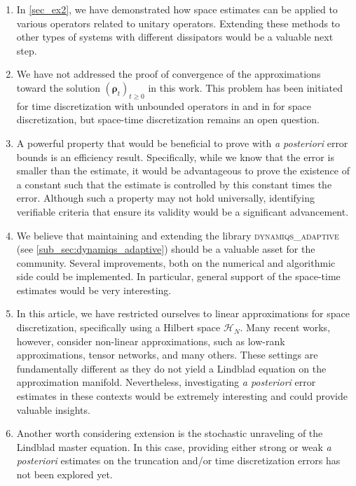 \documentclass[a4paper,onecolumn,amsmath,amssymb,amsfonts,accepted=2026-03-06]{quantumarticle}
\newcommand{\xH}{\mathcal{H}}
\begin{document}
\begin{enumerate}
\item In \cref{sec_ex2}, we have demonstrated how space estimates can be applied to various operators related to unitary operators. Extending these methods to other types of systems with different dissipators would be a valuable next step.
\item We have not addressed the proof of convergence of the approximations toward the solution $(\boldsymbol{\rho}_t)_{t\geq 0}$ in this work. This problem has been initiated for time discretization with unbounded operators in \cite{robin2025unconditionallystabletimediscretization} and in \cite{robin2025convergenceanalysisgalerkinapproximations} for space discretization, but space-time discretization remains an open question.
\item A powerful property that would be beneficial to prove with \textit{a posteriori} error bounds is an efficiency result. Specifically, while we know that the error is smaller than the estimate, it would be advantageous to prove the existence of a constant such that the estimate is controlled by this constant times the error. Although such a property may not hold universally, identifying verifiable criteria that ensure its validity would be a significant advancement.
\item We believe that maintaining and extending the library \textsc{dynamiqs\_adaptive} (see \cref{sub_sec:dynamiqs_adaptive}) should be a valuable asset for the community. Several improvements, both on the numerical and algorithmic side could be implemented. In particular, general support of the space-time estimates would be very interesting.
\item In this article, we have restricted ourselves to linear approximations for space discretization, specifically using a Hilbert space $\xH_N$. Many recent works, however, consider non-linear approximations, such as low-rank approximations, tensor networks, and many others. These settings are fundamentally different as they do not yield a Lindblad equation on the approximation manifold. Nevertheless, investigating \textit{a posteriori} error estimates in these contexts would be extremely interesting and could provide valuable insights.
\item Another worth considering extension is the stochastic unraveling of the Lindblad master equation. In this case, providing either strong or weak \textit{a posteriori} estimates on the truncation and/or time discretization errors has not been explored yet.
\end{enumerate}
\end{document}
